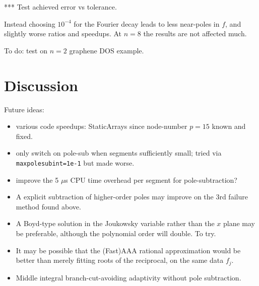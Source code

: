 \documentclass[11pt]{article}
\newcommand{\bi}{\begin{itemize}}
\newcommand{\ei}{\end{itemize}}
\begin{document}
*** Test achieved error vs tolerance.

Instead choosing $10^{-4}$ for the Fourier decay leads to less near-poles in $f$,
and slightly worse ratios and speedups. At $n=8$ the results are not affected much.



To do: test on $n=2$ graphene DOS example.



\section{Discussion}


Future ideas:
\bi
\item various code speedups: StaticArrays since node-number $p=15$ known and fixed.
\item only switch on pole-sub when segments sufficiently small; tried via {\tt maxpolesubint=1e-1} but made worse.
\item improve the 5 $\mu$s CPU time overhead per segment for pole-subtraction?
\item A explicit subtraction of higher-order poles may improve on the 3rd
  failure method found above.
\item A Boyd-type solution in the Joukowsky variable rather than the $x$ plane
  may be preferable, although the polynomial order will double. To try.
\item It may be possible that the (Fast)AAA rational approximation would be
  better than merely fitting roots of the reciprocal, on the same data $f_j$.
\item Middle integral branch-cut-avoiding adaptivity without pole subtraction.
\ei



\end{document}
